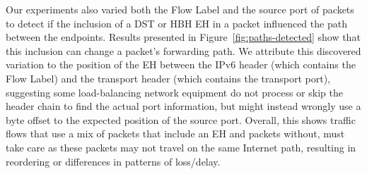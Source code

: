 \documentclass[conference]{IEEEtran}
\begin{document}








Our experiments also varied both the Flow Label and the source port of packets to detect if the inclusion of a DST or HBH EH in a packet influenced the path between the endpoints. Results presented in Figure~\ref{fig:paths-detected} show that this inclusion can change a packet's forwarding path. We attribute this discovered variation to the position of the EH between the IPv6 header (which contains the Flow Label) and the transport header (which contains the transport port), suggesting some load-balancing network equipment do not process or skip the header chain to find the actual port information, but might instead wrongly use a byte offset to the expected position of the source port. Overall, this shows traffic flows that use a mix of packets that include an EH and packets without, must take care as these packets may not travel on the same Internet path, resulting in reordering or differences in patterns of loss/delay. 
\end{document}
